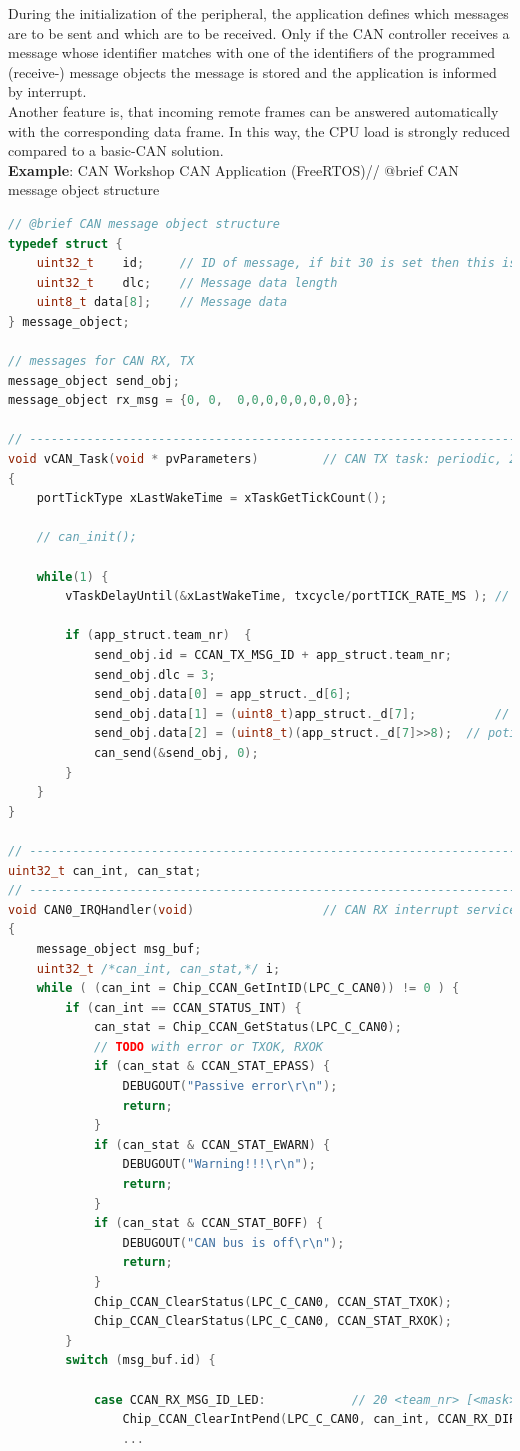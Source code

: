 During the initialization of the peripheral, the application defines which messages are to be sent and which are to be received. Only if the CAN controller receives a message whose identifier matches with one of the identifiers of the programmed (receive-) message objects the message is stored and the application is informed by interrupt. \\

Another feature is, that incoming remote frames can be answered automatically with the corresponding data frame. In this way, the CPU load is strongly reduced compared to a basic-CAN solution.\\

\textbf{ Example}: CAN Workshop CAN Application (FreeRTOS)// @brief CAN message object structure\\

\begin{lstlisting}[style=mystyle, language=c]
// @brief CAN message object structure
typedef struct {
	uint32_t    id;		// ID of message, if bit 30 is set then this is extended frame */
	uint32_t    dlc;	// Message data length
	uint8_t data[8];	// Message data 
} message_object;

// messages for CAN RX, TX
message_object send_obj;
message_object rx_msg = {0, 0,  0,0,0,0,0,0,0,0};

// ----------------------------------------------------------------------------
void vCAN_Task(void * pvParameters) 		// CAN TX task: periodic, 20 ms
{
	portTickType xLastWakeTime = xTaskGetTickCount();

	// can_init();

	while(1) {
		vTaskDelayUntil(&xLastWakeTime, txcycle/portTICK_RATE_MS ); // 20 ms

		if (app_struct.team_nr)  {										// with team_nr set to > 0
			send_obj.id = CCAN_TX_MSG_ID + app_struct.team_nr;
			send_obj.dlc = 3; 												// 3 data bytes
			send_obj.data[0] = app_struct._d[6];						// joystick state
			send_obj.data[1] = (uint8_t)app_struct._d[7];			// poti LSB
			send_obj.data[2] = (uint8_t)(app_struct._d[7]>>8);	// poti MSB
			can_send(&send_obj, 0);
		}
	}	
}

// ----------------------------------------------------------------------------
uint32_t can_int, can_stat;					
// ----------------------------------------------------------------------------
void CAN0_IRQHandler(void) 					// CAN RX interrupt service routine:
{
	message_object msg_buf;
	uint32_t /*can_int, can_stat,*/ i;
	while ( (can_int = Chip_CCAN_GetIntID(LPC_C_CAN0)) != 0 ) {
		if (can_int == CCAN_STATUS_INT) {
			can_stat = Chip_CCAN_GetStatus(LPC_C_CAN0);
			// TODO with error or TXOK, RXOK
			if (can_stat & CCAN_STAT_EPASS) {
				DEBUGOUT("Passive error\r\n");
				return;
			}
			if (can_stat & CCAN_STAT_EWARN) {
				DEBUGOUT("Warning!!!\r\n");
				return;
			}
			if (can_stat & CCAN_STAT_BOFF) {
				DEBUGOUT("CAN bus is off\r\n");
				return;
			}
			Chip_CCAN_ClearStatus(LPC_C_CAN0, CCAN_STAT_TXOK);
			Chip_CCAN_ClearStatus(LPC_C_CAN0, CCAN_STAT_RXOK);
		} 
		switch (msg_buf.id) {

			case CCAN_RX_MSG_ID_LED:			// 20 <team_nr> [<mask>]
				Chip_CCAN_ClearIntPend(LPC_C_CAN0, can_int, CCAN_RX_DIR);
				...	
\end{lstlisting}
\newpage
